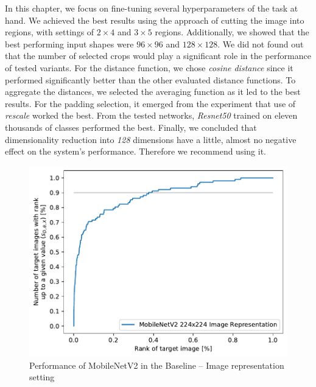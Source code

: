 In this chapter, we focus on fine-tuning several hyperparameters of the task at hand. We achieved the best results using the approach of cutting the image into regions, with settings of $2\times4$ and $3\times5$ regions. Additionally, we showed that the best performing input shapes were $96\times 96$ and $128 \times 128$.  We did not found out that the number of selected crops would play a significant role in the performance of tested variants. For the distance function, we chose \emph{cosine distance} since it performed significantly better than the other evaluated distance functions. To aggregate the distances, we selected the averaging function as it led to the best results. For the padding selection, it emerged from the experiment that use of \emph{rescale} worked the best. From the tested networks, \emph{Resnet50} trained on eleven thousands of classes performed the best. Finally, we concluded that dimensionality reduction into \emph{128} dimensions have a little, almost no negative effect on the system's performance. Therefore we recommend using it. 



\begin{figure}
    \centering
    \includegraphics[width=0.8\linewidth]{graphs/dd20090d2f746141e927422ef0528eed6141a2d1478d86afe3d450e0c99e9765.pdf}
    \caption{Performance of MobileNetV2 in the Baseline -- Image representation setting}
    \label{fig:mobilenet_whole_image_example}
\end{figure}

